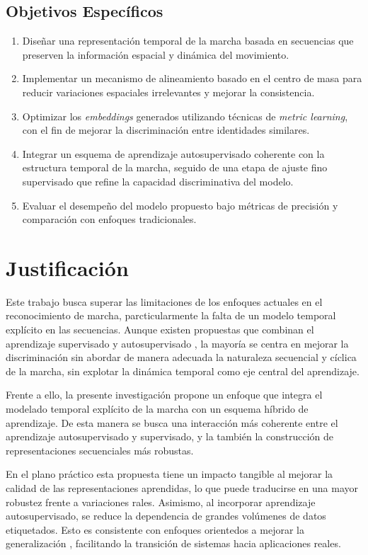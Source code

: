 \subsection*{Objetivos Específicos}
\begin{enumerate}
    \item Diseñar una representación temporal de la marcha basada en secuencias que preserven la información espacial y dinámica del movimiento.
    \item Implementar un mecanismo de alineamiento basado en el centro de masa para reducir variaciones espaciales irrelevantes y mejorar la consistencia.
    \item Optimizar los \textit{embeddings} generados utilizando técnicas de \textit{metric learning}, con el fin de mejorar la discriminación entre identidades similares.
    \item Integrar un esquema de aprendizaje autosupervisado coherente con la estructura temporal de la marcha, seguido de una etapa de ajuste fino supervisado que refine la capacidad discriminativa del modelo.
    \item Evaluar el desempeño del modelo propuesto bajo métricas de precisión y comparación con enfoques tradicionales.
\end{enumerate}

\section{Justificación}

Este trabajo busca superar las limitaciones de los enfoques actuales en el reconocimiento de marcha, parcticularmente la falta de un modelo temporal explícito en las secuencias. Aunque existen propuestas que combinan el aprendizaje supervisado y autosupervisado \citep{Li2020SemiSupGait}, la mayoría se centra en mejorar la discriminación sin abordar de manera adecuada la naturaleza secuencial y cíclica de la marcha, sin explotar la dinámica temporal como eje central del aprendizaje. 

Frente a ello, la presente investigación propone un enfoque que integra el modelado temporal explícito de la marcha con un esquema híbrido de aprendizaje. De esta manera se busca una interacción más coherente entre el aprendizaje autosupervisado y supervisado, y la también la construcción de representaciones secuenciales más robustas. 

En el plano práctico esta propuesta tiene un impacto tangible al mejorar la calidad de las representaciones aprendidas, lo que puede traducirse en una mayor robustez frente a variaciones rales. Asimismo, al incorporar aprendizaje autosupervisado, se reduce la dependencia de grandes volúmenes de datos etiquetados. Esto es consistente con enfoques orientedos a mejorar la generalización \citep{Dou2023IdentitySeeking}, facilitando la transición de sistemas hacia aplicaciones reales.

